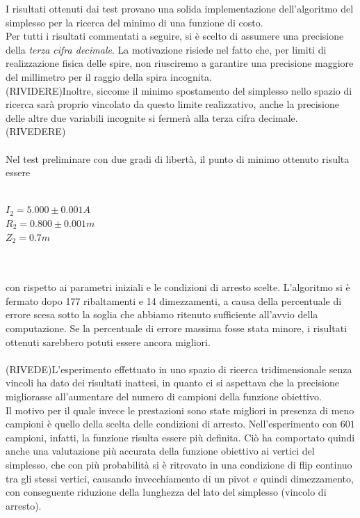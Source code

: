 \documentclass[a4paper, 11pt]{article}
\begin{document}
I risultati ottenuti dai test provano una solida implementazione dell'algoritmo
del simplesso per la ricerca del minimo di una funzione di costo. \\
Per tutti i risultati commentati a seguire, si è scelto di assumere una
precisione della \emph{terza cifra decimale}. La motivazione risiede nel
fatto che, per limiti di realizzazione fisica delle spire, non riusciremo a
garantire una precisione maggiore del millimetro per il raggio della spira
incognita. \\ 
(RIVIDERE)Inoltre, siccome il minimo spostamento del simplesso nello spazio di ricerca
sarà proprio vincolato da questo limite realizzativo, anche la precisione delle
altre due variabili incognite si fermerà alla terza cifra decimale. (RIVEDERE)\\ \\
Nel test preliminare con due gradi di libertà, il punto di minimo ottenuto
risulta essere \\ \\
\centerline{ $I_{2} = 5.000 \pm 0.001 A$ \\ $R_{2} = 0.800 \pm 0.001m$ \\ $Z_{2}
= 0.7m$} \\ \\
con rispetto ai parametri iniziali e le condizioni di arresto scelte.
L'algoritmo si è fermato dopo 177 ribaltamenti e 14 dimezzamenti, a causa della
percentuale di errore scesa sotto la soglia che abbiamo ritenuto sufficiente
all'avvio della computazione. Se la percentuale di errore massima fosse stata
minore, i risultati ottenuti sarebbero potuti essere ancora migliori. \\
\\
(RIVEDE)L'esperimento effettuato in uno spazio di ricerca tridimensionale senza vincoli
ha dato dei risultati inattesi, in quanto ci si aspettava che la precisione
migliorasse all'aumentare del numero di campioni della funzione obiettivo. \\
Il motivo per il quale invece le prestazioni sono state migliori in presenza di
meno campioni è quello della scelta delle condizioni di arresto.
Nell'esperimento con $601$ campioni, infatti, la funzione risulta essere più
definita. Ciò ha comportato quindi anche una valutazione più accurata della
funzione obiettivo ai vertici del simplesso, che con più probabilità si è
ritrovato in una condizione di flip continuo tra gli stessi vertici, causando
invecchiamento di un pivot e quindi dimezzamento, con conseguente riduzione
della lunghezza del lato del simplesso (vincolo di arresto). \\
\end{document}
